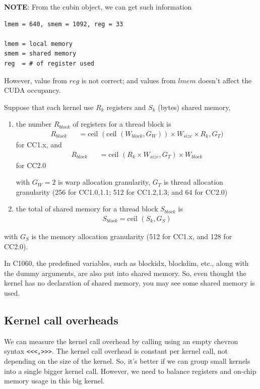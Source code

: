 {\bf NOTE}: From the cubin object, we can get such information
\begin{verbatim}
lmem = 640, smem = 1092, reg = 33

lmem = local memory
smem = shared memory
reg  = # of register used
\end{verbatim}
However, value from $reg$ is not correct; and values from $lmem$
doesn't affect the CUDA occupancy.


Suppose that each kernel use $R_k$ registers and $S_k$ (bytes) shared
memory,
\begin{enumerate}
\item the number $R_{block}$ of registers for a thread block is
  \begin{eqnarray}
    \label{eq:94}
    R_{block} &&= \text{ceil } (\text{ceil }(W_{block},G_W))\times
    W_{size}\times R_k,G_T)
  \end{eqnarray}
  for CC1.x, and
  \begin{eqnarray}
    \label{eq:95}
    R_{block} &&= \text{ceil } (R_k\times W_{size},G_T)\times W_{block}
  \end{eqnarray}
  for CC2.0

  with $G_W=2$ is warp allocation granularity, $G_T$ is thread
  allocation granularity (256 for CC1.0,1.1; 512 for CC1.2,1.3; and 64
  for CC2.0)
\item the total of shared memory for a thread block $S_{block}$ is
  \begin{eqnarray}
    \label{eq:96}
    S_{block}=\text{ceil }(S_k, G_S)
  \end{eqnarray}
\end{enumerate}
with $G_S$ is the memory allocation granularity (512 for CC1.x, and
128 for CC2.0).

In C1060, the predefined variables, such as blockidx, blockdim, etc., along with
the dummy arguments, are also put into shared memory. So, even thought the
kernel has no declaration of shared memory, you may see some shared memory
is used. 

\subsection{Kernel call overheads}
\label{sec:kern-call-overh}

We can measure the kernel call overhead by calling using an empty
chevron syntax \verb!<<<,>>>!. The kernel call overhead is constant
per kernel call, not depending on the size of the kernel. So, it's
better if we can group small kernels into a single bigger kernel
call. However, we need to balance registers and on-chip memory usage
in this big kernel. 

